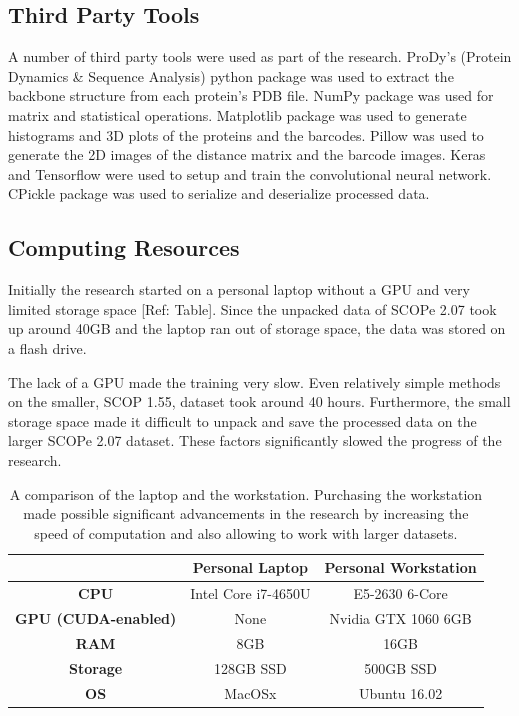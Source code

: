 \documentclass[12pt, a4paper, twocolumn, fullpage]{article}
\theoremstyle{plain}
\theoremstyle{definition}
\theoremstyle{remark}
\begin{document}
\subsection{Third Party Tools}
A number of third party tools were used as part of the research. ProDy's (Protein Dynamics \& Sequence Analysis) python package was used to extract the backbone structure from each protein's PDB file. NumPy package was used for matrix  and statistical operations. Matplotlib package was used to generate histograms and 3D plots of the proteins and the barcodes. Pillow was used to generate the 2D images of the distance matrix and the barcode images. Keras and Tensorflow were used to setup and train the convolutional neural network. CPickle package was used to serialize and deserialize processed data.
\subsection{Computing Resources}
Initially the research started on a personal laptop without a GPU and very limited storage space [Ref: Table]. Since the unpacked data of SCOPe 2.07 took up around 40GB and the laptop ran out of storage space, the data was stored on a flash drive. 

The lack of a GPU made the training very slow. Even relatively simple methods on the smaller, SCOP 1.55, dataset took around 40 hours. Furthermore, the small storage space made it difficult to unpack and save the processed data on the larger SCOPe 2.07 dataset. These factors significantly slowed the progress of the research.


\begin{table}[h]
    \centering
    \begin{tabular}{|c | c | c |}
    	\hline
    	                    &  \textbf{Personal Laptop} &  \textbf{Personal Workstation} \\ \hline
        \textbf{CPU} & Intel Core i7-4650U &  E5-2630 6-Core \\ \hline
         \textbf{GPU (CUDA-enabled)} & None & Nvidia GTX 1060 6GB      \\ \hline
         \textbf{RAM} & 8GB & 16GB   \\ \hline
         \textbf{Storage} & 128GB SSD & 500GB SSD \\ \hline
         \textbf{OS} & MacOSx   & Ubuntu 16.02 \\ \hline
    \end{tabular}
    \caption{A comparison of the laptop and the workstation. Purchasing the workstation made possible significant advancements in the research by increasing the speed of computation and also allowing to work with larger datasets. }
    \label{tbl:Computers}
\end{table}
\end{document}
